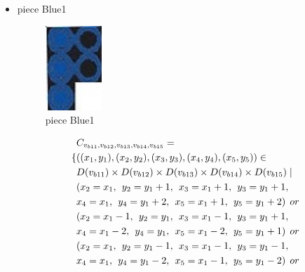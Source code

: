 \begin{appendices}
\begin{itemize}
  \item piece Blue1 
\begin{figure}[H]
    \centering
    \includegraphics[width=0.2\textwidth]{figs/blue1.jpg}
    \caption{piece Blue1}
\end{figure}
  \begin{align*}
&\Cons{b11}{b12}{b13}{b14}{b15}=
\\\{&((x_{1},y_{1}),(x_{2},y_{2}),(x_{3},y_{3}),(x_{4},y_{4}),(x_{5},y_{5}))\in \\
&\Domain {b11} \times \Domain{b12}\times \Domain{b13}\times \Domain{b14}\times \Domain{b15} \mid\\
&(x_{2} = x_{1},\hspace{1ex}y_{2} = y_{1}+1,\hspace{1ex}x_{3} = x_{1}+1,\hspace{1ex}y_{3} = y_{1}+1,
\\&x_{4} = x_{1},\hspace{1ex}y_{4} = y_{1}+2,\hspace{1ex}x_{5} = x_{1}+1,\hspace{1ex}y_{5} = y_{1}+2)\hspace{1ex} or \\
&(x_{2} = x_{1}-1 ,\hspace{1ex}y_{2} = y_{1},\hspace{1ex}x_{3} = x_{1}-1,\hspace{1ex}y_{3} = y_{1}+1,
\\&x_{4} = x_{1}-2,\hspace{1ex}y_{4} = y_{1},\hspace{1ex}x_{5} = x_{1}-2,\hspace{1ex}y_{5} = y_{1}+1)\hspace{1ex} or \\
&(x_{2} = x_{1} ,\hspace{1ex}y_{2} = y_{1}-1,\hspace{1ex}x_{3} = x_{1}-1,\hspace{1ex}y_{3} = y_{1}-1,
\\&x_{4} = x_{1},\hspace{1ex}y_{4} = y_{1}-2,\hspace{1ex}x_{5} = x_{1}-1,\hspace{1ex}y_{5} = y_{1}-2)\hspace{1ex} or \\

\end{align*}
\end{itemize}
\end{appendices}
